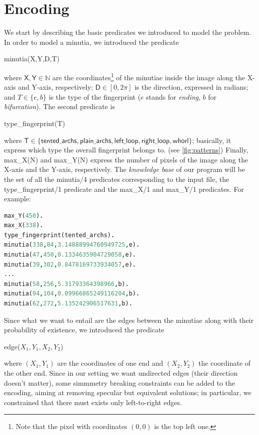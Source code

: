 \documentclass[8pt]{article}
\begin{document}
\section{Encoding}
\label{sec:encoding}
We start by describing the basic predicates we introduced to model
the problem. In order to model a minutia, we introduced the predicate
  \begin{center}
    \textsf{minutia(X,Y,D,T)}
  \end{center}
where $\textsf{X},\textsf{Y} \in \mathbb{N}$ are the coordinates\footnote{Note 
that the pixel with coordinates $(0,0)$ is the top left one.}
of the minutiae inside the image along the X-axis and Y-axis, respectively;
$\textsf{D} \in [0,2\pi]$ is the direction, expressed in radians; 
and $T \in \{e,b\}$ is the type of the fingerprint ($e$ stands for
\emph{ending}, $b$ for \emph{bifurcation}).
The second predicate is
  \begin{center}
    \textsf{type\_fingerprint(T)}
  \end{center}
where $\textsf{T}\in\{
  \textsf{tented\_archs},
  \textsf{plain\_archs},
  \textsf{left\_loop},
  \textsf{right\_loop},
  \textsf{whorl}
\}$; 
basically, it express which type the overall fingerprint belongs to.
(see \cref{fig:patterns})
Finally, \textsf{max\_X(N)} and \textsf{max\_Y(N)} express the number
of pixels of the image along the X-axis and the Y-axis, respectively.
The \emph{knowledge base} of our program will be the set of all the 
\textsf{minutia/4} predicates corresponding to the input file,
the \textsf{type\_fingerprint/1} predicate and the \textsf{max\_X/1}
and \textsf{max\_Y/1} predicates. For example:
  \begin{center}
  \begin{lstlisting}[language=Prolog,frame = single]
max_Y(450).
max_X(338).
type_fingerprint(tented_archs).
minutia(338,84,3.14888994760949725,e).
minutia(47,450,0.1334635904729058,e).
minutia(39,302,0.8478169733934057,e).
...
minutia(58,256,5.31793364398966,b).
minutia(94,104,0.09966865249116204,b).
minutia(62,272,5.135242906517631,b).
  \end{lstlisting}
  \end{center}
Since what we want to entail are the edges between the minutiae along
with their probability of existence, we introduced the predicate
  \begin{center}
    \textsf{edge($X_1,Y_1,X_2,Y_2$)}
  \end{center}
where $(X_1,Y_1)$ are the coordinates of one end and $(X_2,Y_2)$
the coordinate of the other end.
Since in our setting we want undirected edges (their direction doesn't
matter), some simmmetry breaking constraints can be added to the 
encoding, aiming at removing specular but equivalent solutions; in
particular, we constrained that there must exists only left-to-right
edges.
\end{document}
